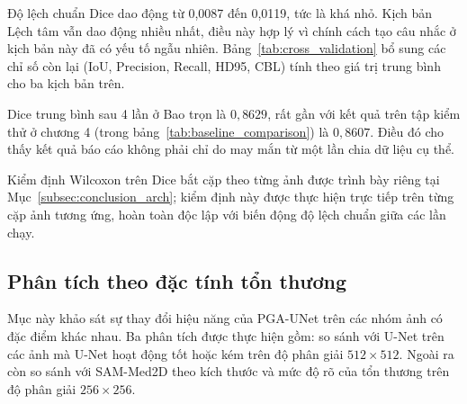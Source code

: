 Độ lệch chuẩn Dice dao động từ 0,0087 đến 0,0119, tức là khá nhỏ. Kịch bản Lệch tâm vẫn dao động nhiều nhất, điều này hợp lý vì chính cách tạo câu nhắc ở kịch bản này đã có yếu tố ngẫu nhiên. Bảng~\ref{tab:cross_validation} bổ sung các chỉ số còn lại (IoU, Precision, Recall, HD95, CBL) tính theo giá trị trung bình cho ba kịch bản trên.

\begin{table}[H]
    \centering
    \caption{Kết quả trung bình của kiểm chứng chéo ngẫu nhiên lặp lại 4 lần của PGA-UNet trên ba kịch bản câu nhắc}
    \label{tab:cross_validation}
    \renewcommand{\arraystretch}{1.3}
\end{table}

Dice trung bình sau 4 lần ở Bao trọn là $0{,}8629$, rất gần với kết quả trên tập kiểm thử ở chương 4 (trong bảng~\ref{tab:baseline_comparison}) là $0{,}8607$. Điều đó cho thấy kết quả báo cáo không phải chỉ do may mắn từ một lần chia dữ liệu cụ thể.

Kiểm định Wilcoxon trên Dice bắt cặp theo từng ảnh được trình bày riêng tại Mục~\ref{subsec:conclusion_arch}; kiểm định này được thực hiện trực tiếp trên từng cặp ảnh tương ứng, hoàn toàn độc lập với biến động độ lệch chuẩn giữa các lần chạy.
\subsection{Phân tích theo đặc tính tổn thương}
\label{subsec:subcategory}

Mục này khảo sát sự thay đổi hiệu năng của PGA-UNet trên các nhóm ảnh có đặc điểm khác nhau. Ba phân tích được thực hiện gồm: so sánh với U-Net trên các ảnh mà U-Net hoạt động tốt hoặc kém trên độ phân giải $512\times512$. Ngoài ra còn so sánh với SAM-Med2D theo kích thước và mức độ rõ của tổn thương trên độ phân giải $256\times256$.

